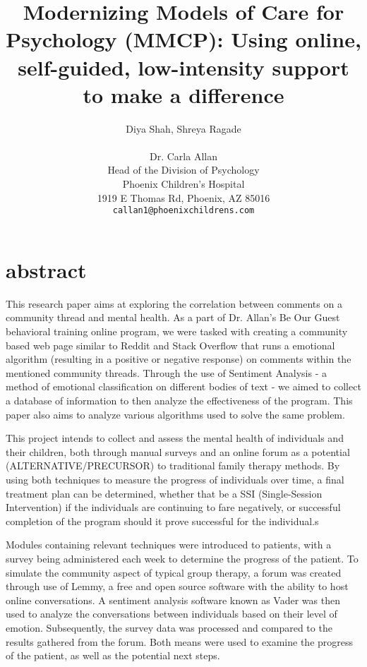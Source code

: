 \documentclass[letterpaper, 12 pt, conference]{ieeeconf}
\title{\LARGE \bf
Modernizing Models of Care for Psychology (MMCP): Using online, self-guided, low-intensity support to make a difference
}
\author{Diya Shah, Shreya Ragade%
\\ \\
Dr. Carla Allan%
\\ Head of the Division of Psychology \\
Phoenix Children’s Hospital \\
1919 E Thomas Rd, Phoenix, AZ 85016\\
{\tt\small callan1@phoenixchildrens.com}
}
\begin{document}
\maketitle
\thispagestyle{plain}
\pagestyle{plain}



\section{abstract}

This research paper aims at exploring the correlation between comments on a community thread and mental health. As a part of Dr. Allan's Be Our Guest behavioral training online program, we were tasked with creating a community based web page similar to Reddit and Stack Overflow that runs a emotional algorithm (resulting in a positive or negative response) on comments within the mentioned community threads. Through the use of Sentiment Analysis - a method of emotional classification on different bodies of text - we aimed to collect a database of information to then analyze the effectiveness of the program. This paper also aims to analyze various algorithms used to solve the same problem.

This project intends to collect and assess the mental health of individuals and their children, both through manual surveys and an online forum as a potential (ALTERNATIVE/PRECURSOR) to traditional family therapy methods. By using both techniques to measure the progress of individuals over time, a final treatment plan can be determined, whether that be a SSI (Single-Session Intervention) if the individuals are continuing to fare negatively, or successful completion of the program should it prove successful for the individual.s

Modules containing relevant techniques were introduced to patients, with a survey being administered each week to determine the progress of the patient. To simulate the community aspect of typical group therapy, a forum was created through use of Lemmy, a free and open source software with the ability to host online conversations. A sentiment analysis software known as Vader was then used to analyze the conversations between individuals based on their level of emotion. Subsequently, the survey data was processed and compared to the results gathered from the forum. Both means were used to examine the progress of the patient, as well as the potential next steps.  
\end{document}
